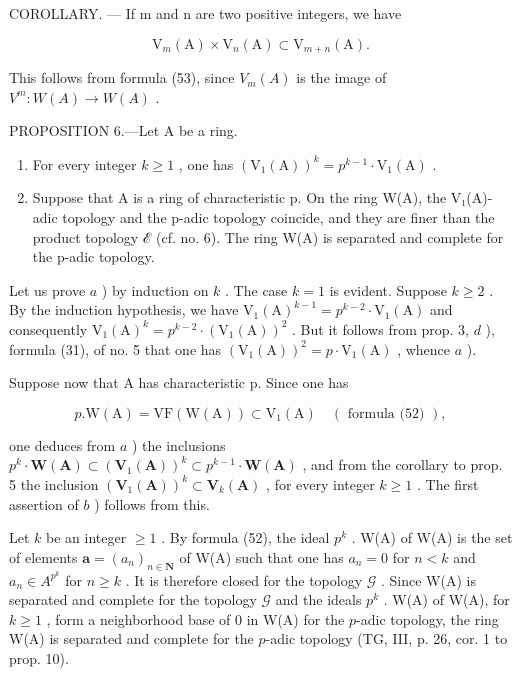 COROLLARY. --- If m and n are two positive integers, we have

\[
\mathrm{V} _ {m} (\mathrm{A}) \times \mathrm{V} _ {n} (\mathrm{A}) \subset \mathrm{V} _ {m + n} (\mathrm{A}).
\]

This follows from formula (53), since \(V_{m}(A)\) is the image of \(V^{m}:W(A)\to W(A)\) .

PROPOSITION 6.---Let A be a ring.

\begin{enumerate}
\def\labelenumi{\alph{enumi})}
\item
  For every integer \(k \geqslant 1\) , one has \((\mathrm{V}_1(\mathrm{A}))^k = p^{k-1} \cdot \mathrm{V}_1(\mathrm{A})\) .
\item
  Suppose that A is a ring of characteristic p. On the ring W(A), the V₁(A)-adic topology and the p-adic topology coincide, and they are finer than the product topology ℰ (cf. no. 6). The ring W(A) is separated and complete for the p-adic topology.
\end{enumerate}

Let us prove \(a\) ) by induction on \(k\) . The case \(k = 1\) is evident. Suppose \(k \geqslant 2\) . By the induction hypothesis, we have \(\mathrm{V}_{1}(\mathrm{A})^{k-1} = p^{k-2} \cdot \mathrm{V}_{1}(\mathrm{A})\) and consequently \(\mathrm{V}_{1}(\mathrm{A})^{k} = p^{k-2} \cdot (\mathrm{V}_{1}(\mathrm{A}))^{2}\) . But it follows from prop. 3, \(d\) ), formula (31), of no. 5 that one has \((\mathrm{V}_{1}(\mathrm{A}))^{2} = p \cdot \mathrm{V}_{1}(\mathrm{A})\) , whence \(a\) ).

Suppose now that A has characteristic p. Since one has

\[
p. \mathrm{W} (\mathrm{A}) = \mathrm{VF} (\mathrm{W} (\mathrm{A})) \subset \mathrm{V} _ {1} (\mathrm{A}) \quad (\text { formula (52) }),
\]

one deduces from \(a\) ) the inclusions \(p^{k} \cdot \mathbf{W}(\mathbf{A}) \subset (\mathbf{V}_{1}(\mathbf{A}))^{k} \subset p^{k-1} \cdot \mathbf{W}(\mathbf{A})\) , and from the corollary to prop. 5 the inclusion \((\mathbf{V}_{1}(\mathbf{A}))^{k} \subset \mathbf{V}_{k}(\mathbf{A})\) , for every integer \(k \geqslant 1\) . The first assertion of \(b\) ) follows from this.

Let \(k\) be an integer \(\geqslant 1\) . By formula (52), the ideal \(p^{k}\) . W(A) of W(A) is the set of elements \(\boldsymbol{a} = (a_{n})_{n \in \mathbf{N}}\) of W(A) such that one has \(a_{n} = 0\) for \(n < k\) and \(a_{n} \in A^{p^{k}}\) for \(n \geqslant k\) . It is therefore closed for the topology \(\mathcal{G}\) . Since W(A) is separated and complete for the topology \(\mathcal{G}\) and the ideals \(p^{k}\) . W(A) of W(A), for \(k \geqslant 1\) , form a neighborhood base of 0 in W(A) for the \(p\)-adic topology, the ring W(A) is separated and complete for the \(p\)-adic topology (TG, III, p. 26, cor. 1 to prop. 10).

